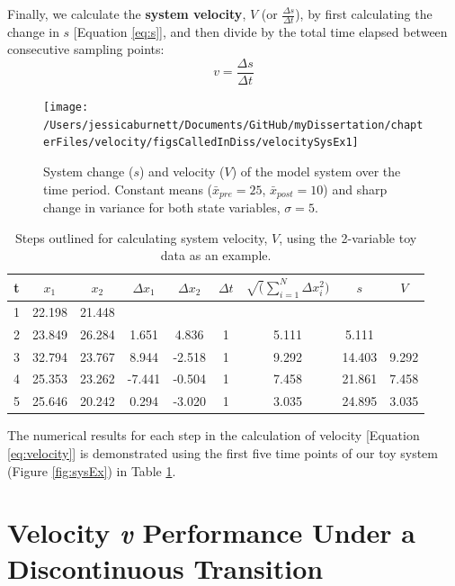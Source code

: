 \documentclass[12pt,twoside,openany]{reedthesis}
\begin{document}
Finally, we calculate the \textbf{system velocity}, \(V\) (or \(\frac{\Delta s}{\Delta t}\)), by first calculating the change in \(s\) {[}Equation \eqref{eq:s}{]}, and then divide by the total time elapsed between consecutive sampling points:
\begin{equation}
 v = \frac {\Delta s}{\Delta t} 
\label{eq:velocity}
\end{equation}
\begin{figure}
\texttt{[image: /Users/jessicaburnett/Documents/GitHub/myDissertation/chapterFiles/velocity/figsCalledInDiss/velocitySysEx1]} \caption{System change ($s$) and velocity ($V$) of the model system over the time period. Constant means ($\bar{x}_{pre}=25$, $\bar{x}_{post}=10$) and sharp change in variance for both state variables, $\sigma =5$.}\label{fig:velocSysEx1}
\end{figure}
\begin{table}[t]

\caption{\label{tab:distTab}Steps outlined for calculating system velocity, $V$, using the 2-variable toy data as an example.}
\centering
\begin{tabular}{ccccccccc}
\toprule
t & $x_1$ & $x_2$ & $\Delta x_1$ & $\Delta x_2$ & $\Delta t$ & $\sqrt(\sum_{i=1}^N \Delta x_i^2) $ & $s$ & $V$\\
\midrule
1 & 22.198 & 21.448 &  &  &  &  &  & \\
2 & 23.849 & 26.284 & 1.651 & 4.836 & 1 & 5.111 & 5.111 & \\
3 & 32.794 & 23.767 & 8.944 & -2.518 & 1 & 9.292 & 14.403 & 9.292\\
4 & 25.353 & 23.262 & -7.441 & -0.504 & 1 & 7.458 & 21.861 & 7.458\\
5 & 25.646 & 20.242 & 0.294 & -3.020 & 1 & 3.035 & 24.895 & 3.035\\
\bottomrule
\end{tabular}
\end{table}
The numerical results for each step in the calculation of velocity {[}Equation \eqref{eq:velocity}{]} is demonstrated using the first five time points of our toy system (Figure \ref{fig:sysEx}) in Table \ref{tab:distTab}.

\hypertarget{velocity-v-performance-under-a-discontinuous-transition}{%
\section{\texorpdfstring{Velocity \emph{v} Performance Under a Discontinuous Transition}{Velocity v Performance Under a Discontinuous Transition}}\label{velocity-v-performance-under-a-discontinuous-transition}}
\end{document}
